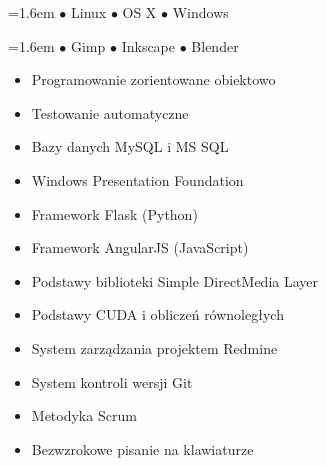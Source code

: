 \documentclass[11pt,a4paper]{article}
\begin{document}
    \medskip
    \noindent
    \begin{minipage}[t]{0.45\textwidth}
  
        
        
        \medskip
        \parindent=1.6em
        $\bullet$ Linux
        \hfill
        $\bullet$ OS X
        \hfill
        $\bullet$ Windows
    \end{minipage}
    \begin{minipage}[t]{0.07\textwidth}
        \hfill
    \end{minipage}
    \begin{minipage}[t]{0.45\textwidth}
  
        
        
        \medskip
        \parindent=1.6em
        $\bullet$ Gimp
        \hfill
        $\bullet$ Inkscape
        \hfill
        $\bullet$ Blender
    \end{minipage}


    \vspace{0.1cm}

    \medskip
    \begin{itemize} \itemsep2pt \parskip0pt 
        \item Programowanie zorientowane obiektowo
        \item Testowanie automatyczne
        \item Bazy danych MySQL i MS SQL
        \item Windows Presentation Foundation
        \item Framework Flask (Python)
        \item Framework AngularJS (JavaScript)
        \item Podstawy biblioteki Simple DirectMedia Layer
        \item Podstawy CUDA i obliczeń równoległych
        \item System zarządzania projektem Redmine
        \item System kontroli wersji Git
        \item Metodyka Scrum
        \item Bezwzrokowe pisanie na klawiaturze
    \end{itemize}
  
\end{document}
